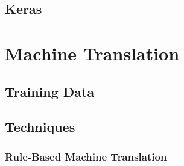 

\subsection{Keras}



\section{Machine Translation}
\label{Machine Translation}


\subsection{Training Data}

\subsection{Techniques}

\subsubsection{Rule-Based Machine Translation}

